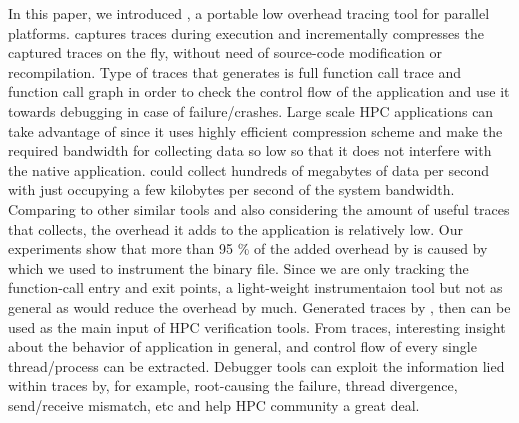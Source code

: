 
In this paper, we introduced \parlot, a portable low overhead tracing tool for parallel platforms. \parlot captures traces during execution and incrementally compresses the captured traces on the fly, without need of source-code modification or recompilation. 
Type of traces that \parlot generates is full function call trace and function call graph in order to check the control flow of the application and use it towards debugging in case of failure/crashes. Large scale HPC applications can take advantage of \parlot since it uses highly efficient compression scheme and make the required bandwidth for collecting data so low so that it does not interfere with the native application. \parlot could collect hundreds of megabytes of data per second with just occupying a few kilobytes per second of the system bandwidth. Comparing to other similar tools and also considering the amount of useful traces that \parlot collects, the overhead it adds to the application is relatively low.
Our experiments show that more than 95 \% of the added overhead by \parlot is caused by \pin which we used to instrument the binary file. Since we are only tracking the function-call entry and exit points, a light-weight instrumentaion tool but not as general as \pin would reduce the overhead by much.
Generated traces by \parlot, then can be used as the main input of HPC verification tools. From \parlot traces, interesting insight about the behavior of application in general, and control flow of every single thread/process can be extracted. Debugger tools can exploit the information lied within \parlot traces by, for example, root-causing the failure, thread divergence, send/receive mismatch, etc and help HPC community a great deal. 
